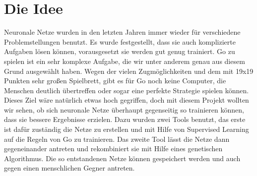 \section{Die Idee}
Neuronale Netze wurden in den letzten Jahren immer wieder für verschiedene
Problemstellungen benutzt. Es wurde festgestellt, dass sie auch komplizierte
Aufgaben lösen können, vorausgesetzt sie werden gut genug trainiert. Go zu
spielen ist ein sehr komplexe Aufgabe, die wir unter anderem genau aus diesem
Grund ausgewählt haben. Wegen der vielen Zugmöglichkeiten und dem mit 19x19
Punkten sehr großen Spielbrett, gibt es für Go noch keine Computer, die
Menschen deutlich übertreffen oder sogar eine perfekte Strategie spielen
können. Dieses Ziel wäre natürlich etwas hoch gegriffen, doch mit diesem
Projekt wollten wir sehen, ob sich neuronale Netze überhaupt gegenseitig so
trainieren können, dass sie bessere Ergebnisse erzielen. Dazu wurden zwei Tools
benutzt, das erste ist dafür zuständig die Netze zu erstellen und mit Hilfe von
Supervised Learning auf die Regeln von Go zu trainieren. Das zweite Tool lässt
die Netze dann gegeneinander antreten und rekombiniert sie mit Hilfe eines
genetischen Algorithmus. Die so entstandenen Netze können gespeichert werden
und auch gegen einen menschlichen Gegner antreten.
